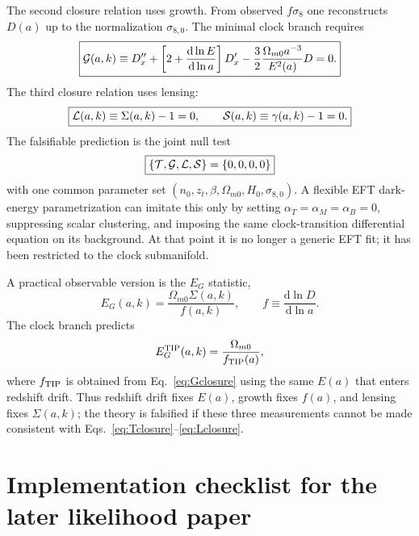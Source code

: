 \documentclass[aps,prd,reprint,nofootinbib,superscriptaddress,longbibliography]{revtex4-2}
\newcommand{\dd}{\mathrm{d}}
\begin{document}
The second closure relation uses growth.  From observed $f\sigma_8$ one reconstructs $D(a)$ up to the normalization $\sigma_{8,0}$.  The minimal clock branch requires
\begin{equation}
  \boxed{
  {\cal G}(a,k)\equiv
  D''_x+\left[2+\frac{\dd\ln E}{\dd\ln a}\right]D'_x
  -\frac32\frac{\Omega_{m0}a^{-3}}{E^2(a)}D=0 .}
  \label{eq:Gclosure}
\end{equation}
The third closure relation uses lensing:
\begin{equation}
  \boxed{
  {\cal L}(a,k)\equiv \Sigma(a,k)-1=0,
  \qquad
  {\cal S}(a,k)\equiv\gamma(a,k)-1=0 .}
  \label{eq:Lclosure}
\end{equation}
The falsifiable prediction is the joint null test
\begin{equation}
  \boxed{
  \left\{{\cal T},{\cal G},{\cal L},{\cal S}\right\}=\{0,0,0,0\}}
  \label{eq:jointclosure}
\end{equation}
with one common parameter set $(n_0,z_t,\beta,\Omega_{m0},H_0,\sigma_{8,0})$.  A flexible EFT dark-energy parametrization can imitate this only by setting $\alpha_T=\alpha_M=\alpha_B=0$, suppressing scalar clustering, and imposing the same clock-transition differential equation on its background.  At that point it is no longer a generic EFT fit; it has been restricted to the clock submanifold.

A practical observable version is the $E_G$ statistic,
\begin{equation}
  E_G(a,k)=\frac{\Omega_{m0}\Sigma(a,k)}{f(a,k)},
  \qquad
  f\equiv\frac{\dd\ln D}{\dd\ln a} .
  \label{eq:EG_prediction}
\end{equation}
The clock branch predicts
\begin{equation}
  E_G^{\rm TIP}(a,k)=\frac{\Omega_{m0}}{f_{\rm TIP}(a)},
  \label{eq:EG_TIP}
\end{equation}
where $f_{\rm TIP}$ is obtained from Eq.~\eqref{eq:Gclosure} using the same $E(a)$ that enters redshift drift.  Thus redshift drift fixes $E(a)$, growth fixes $f(a)$, and lensing fixes $\Sigma(a,k)$; the theory is falsified if these three measurements cannot be made consistent with Eqs.~\eqref{eq:Tclosure}--\eqref{eq:Lclosure}.

\section{Implementation checklist for the later likelihood paper}
\label{sec:implementation_checklist_completion}
\end{document}
